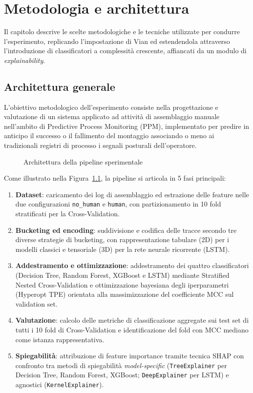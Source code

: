 \chapter{Metodologia e architettura}
\label{cha:methodology}

Il capitolo descrive le scelte metodologiche e le tecniche utilizzate per condurre l'esperimento, replicando l'impostazione di Vian \cite{ppm-human-centered-vian2024} ed estendendola attraverso l'introduzione di classificatori a complessità crescente, affiancati da un modulo di \textit{explainability}.

\section{Architettura generale}
\label{sec:architecture}
L'obiettivo metodologico dell'esperimento consiste nella progettazione e valutazione di un sistema applicato ad attività di assemblaggio manuale nell'ambito di Predictive Process Monitoring (PPM), implementato per predire in anticipo il successo o il fallimento del montaggio associando o meno ai tradizionali registri di processo i segnali posturali dell'operatore.
\begin{figure}[htbp]
    \centering
    \caption{Architettura della pipeline sperimentale}
    \label{fig:pipeline_architecture}
\end{figure}

Come illustrato nella Figura~\ref{fig:pipeline_architecture}, la pipeline si articola in 5 fasi principali:
\begin{enumerate}
    \item \textbf{Dataset}: caricamento dei log di assemblaggio ed estrazione delle feature nelle due configurazioni \texttt{no\_human} e \texttt{human}, con partizionamento in 10 fold stratificati per la Cross-Validation.
    \item \textbf{Bucketing ed encoding}: suddivisione e codifica delle tracce secondo tre diverse strategie di bucketing, con rappresentazione tabulare (2D) per i modelli classici e tensoriale (3D) per la rete neurale ricorrente (LSTM).
    \item \textbf{Addestramento e ottimizzazione}: addestramento dei quattro classificatori (Decision Tree, Random Forest, XGBoost e LSTM) mediante Stratified Nested Cross-Validation e ottimizzazione bayesiana degli iperparametri (Hyperopt TPE) orientata alla massimizzazione del coefficiente MCC sul validation set.
    \item \textbf{Valutazione}: calcolo delle metriche di classificazione aggregate sui test set di tutti i 10 fold di Cross-Validation e identificazione del fold con MCC mediano come istanza rappresentativa.
    \item \textbf{Spiegabilità}: attribuzione di feature importance tramite tecnica SHAP con confronto tra metodi di spiegabilità \textit{model-specific} (\texttt{TreeExplainer} per Decision Tree, Random Forest, XGBoost; \texttt{DeepExplainer} per LSTM) e agnostici (\texttt{KernelExplainer}).
\end{enumerate}

